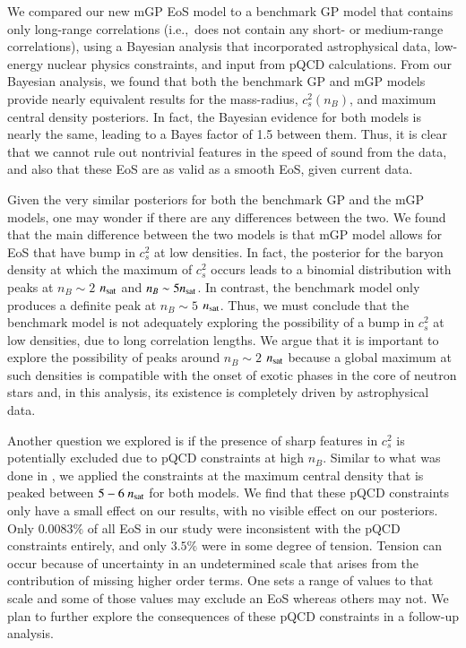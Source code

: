 \documentclass[aps,prd,nofootinbib,tightenlines,notitlepage,floatfix,superscriptaddress,showkeys,twocolumn]{revtex4-1}
\begin{document}
We compared our new mGP EoS model to a benchmark GP model that contains only long-range correlations (i.e.,~does not contain any short-  or medium-range correlations), using a Bayesian analysis that incorporated astrophysical data, low-energy nuclear physics constraints, and input from pQCD calculations. From our Bayesian analysis, we found that both the benchmark GP and mGP models provide nearly equivalent results for the mass-radius, $c_s^2(n_B)$, and maximum central density posteriors. In fact, the Bayesian evidence for both models is nearly the same, leading to a Bayes factor of 1.5 between them. Thus, it is clear that we cannot rule out nontrivial features in the speed of sound from the data, and also that these EoS are as valid as a smooth EoS, given current data. 

Given the very similar posteriors for both the benchmark GP and the mGP models, one may wonder if there are any differences between the two.  We found that the main difference between the two models is that mGP model allows for EoS that have bump in $c_s^2$ at low densities.  In fact, the posterior for the baryon density at which the maximum of $c_s^2$ occurs leads to a binomial distribution with peaks at $n_B\sim 2$ $n_{\rm sat}$ and $n_B\sim 5 n_{\rm sat}$.  In contrast, the benchmark model only produces a definite peak at $n_B\sim 5$ $n_{\rm sat}$.  Thus, we must conclude that the benchmark model is not adequately exploring the possibility of a bump in $c_s^2$ at low densities, due to long correlation lengths. We argue that it is important to explore the possibility of peaks around $n_B\sim 2$ $n_{\rm sat}$ because a global maximum at such densities is compatible with the onset of exotic phases in the core of neutron stars and, in this analysis, its existence is completely driven by astrophysical data.  

Another question we explored is if the presence of sharp features in $c_s^2$ is potentially excluded due to pQCD constraints at high $n_B$. Similar to what was done in \cite{Somasundaram:2022ztm}, we applied the constraints at the maximum central density that is peaked between $5 - 6 \ n_{\rm sat}$ for both models.  We find that these pQCD constraints only have a small effect on our results, with no visible effect on our posteriors. Only $0.0083\%$ of all EoS in our study were inconsistent with the pQCD constraints entirely, and only $3.5\%$ were in some degree of tension. Tension can occur because of uncertainty in an undetermined scale that arises from the contribution of missing higher order terms. One sets a range of values to that scale and some of those values may exclude an EoS whereas others may not. We plan to further explore the consequences of these pQCD constraints in a follow-up analysis.
\end{document}

